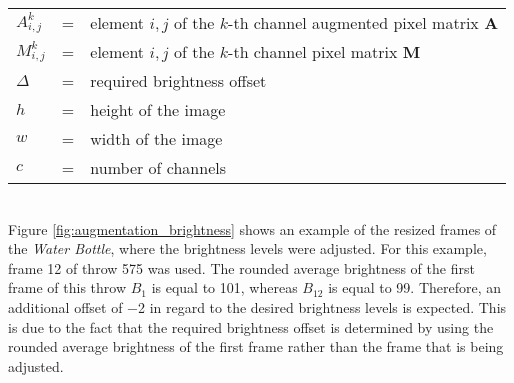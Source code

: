 \begin{tabular}{lll}
  $A_{i,j}^{k}$ & = & element $i,j$ of the $k$-th channel augmented pixel matrix $\boldsymbol{A}$ \\
  $M_{i,j}^{k}$ & = & element $i,j$ of the $k$-th channel pixel matrix $\boldsymbol{M}$ \\
  $\Delta$ & = & required brightness offset \\
  $h$ & = & height of the image \\
  $w$ & = & width of the image \\
  $c$ & = & number of channels \\
\end{tabular}
\\

Figure \ref{fig:augmentation_brightness} shows an example of the resized frames of the \textit{Water Bottle}, where the brightness levels were adjusted.
For this example, frame \num{12} of throw \num{575} was used.
The rounded average brightness of the first frame of this throw $B_1$ is equal to \num{101}, whereas $B_{12}$ is equal to \num{99}.
Therefore, an additional offset of \num{-2} in regard to the desired brightness levels is expected.
This is due to the fact that the required brightness offset is determined by using the rounded average brightness of the first frame rather than the frame that is being adjusted. %

